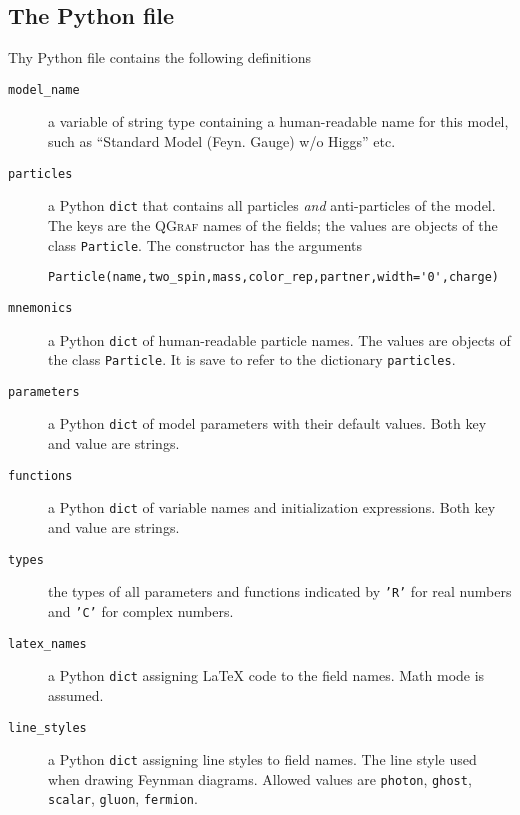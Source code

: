 \documentclass[11pt,a4paper]{refrep}
\newcommand{\qgraf}{\textsc{QGraf}\xspace}
\newcommand{\python}{{Python}\xspace}
\begin{document}
\subsection{The \python{} file}
Thy \python{} file contains the following definitions
\begin{description}
\item[\texttt{model\_name}] a variable of string type containing a human-readable
     name for this model, such as ``Standard Model (Feyn. Gauge) w/o Higgs'' etc.
\item[\texttt{particles}] a \python{} \texttt{dict} that contains all particles
     \emph{and} anti-particles of the model. The keys are the \qgraf{} names of the
     fields; the values are objects of the class \texttt{Particle}.
     The constructor has the arguments
     \begin{verbatim}
Particle(name,two_spin,mass,color_rep,partner,width='0',charge)
     \end{verbatim}
\item[\texttt{mnemonics}] a \python{} \texttt{dict} of
     human-readable particle names. The values are objects of the class
     \texttt{Particle}. It is save to refer to the dictionary \texttt{particles}.
\item[\texttt{parameters}] a \python{} \texttt{dict} of
     model parameters with their default values. Both key and value are strings.
\item[\texttt{functions}] a \python{} \texttt{dict} of
     variable names and initialization expressions. Both key and value are strings.
\item[\texttt{types}] the types of all parameters and functions indicated by
     \texttt{'R'} for real numbers and \texttt{'C'} for complex numbers.
\item[\texttt{latex\_names}] a \python{} \texttt{dict} assigning \LaTeX{}
     code to the field names. Math mode is assumed.
\item[\texttt{line\_styles}] a \python{} \texttt{dict} assigning line styles
     to field names. The line style used when drawing Feynman diagrams.
     Allowed values are \texttt{photon}, \texttt{ghost}, \texttt{scalar},
     \texttt{gluon}, \texttt{fermion}.
\end{description}
\end{document}
